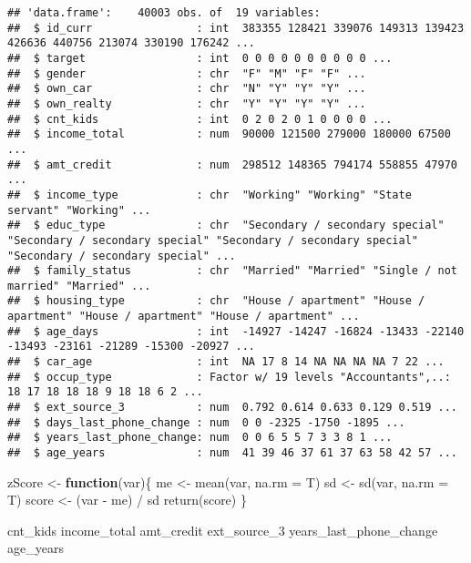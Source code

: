 \documentclass[
]{article}
\newenvironment{Shaded}{\begin{snugshade}}{\end{snugshade}}
\newcommand{\AttributeTok}[1]{\textcolor[rgb]{0.77,0.63,0.00}{#1}}
\newcommand{\ControlFlowTok}[1]{\textcolor[rgb]{0.13,0.29,0.53}{\textbf{#1}}}
\newcommand{\FunctionTok}[1]{\textcolor[rgb]{0.00,0.00,0.00}{#1}}
\newcommand{\NormalTok}[1]{#1}
\newcommand{\OtherTok}[1]{\textcolor[rgb]{0.56,0.35,0.01}{#1}}
\newcommand{\SpecialCharTok}[1]{\textcolor[rgb]{0.00,0.00,0.00}{#1}}
\begin{document}
\begin{verbatim}
## 'data.frame':    40003 obs. of  19 variables:
##  $ id_curr                : int  383355 128421 339076 149313 139423 426636 440756 213074 330190 176242 ...
##  $ target                 : int  0 0 0 0 0 0 0 0 0 0 ...
##  $ gender                 : chr  "F" "M" "F" "F" ...
##  $ own_car                : chr  "N" "Y" "Y" "Y" ...
##  $ own_realty             : chr  "Y" "Y" "Y" "Y" ...
##  $ cnt_kids               : int  0 2 0 2 0 1 0 0 0 0 ...
##  $ income_total           : num  90000 121500 279000 180000 67500 ...
##  $ amt_credit             : num  298512 148365 794174 558855 47970 ...
##  $ income_type            : chr  "Working" "Working" "State servant" "Working" ...
##  $ educ_type              : chr  "Secondary / secondary special" "Secondary / secondary special" "Secondary / secondary special" "Secondary / secondary special" ...
##  $ family_status          : chr  "Married" "Married" "Single / not married" "Married" ...
##  $ housing_type           : chr  "House / apartment" "House / apartment" "House / apartment" "House / apartment" ...
##  $ age_days               : int  -14927 -14247 -16824 -13433 -22140 -13493 -23161 -21289 -15300 -20927 ...
##  $ car_age                : int  NA 17 8 14 NA NA NA NA 7 22 ...
##  $ occup_type             : Factor w/ 19 levels "Accountants",..: 18 17 18 18 18 9 18 18 6 2 ...
##  $ ext_source_3           : num  0.792 0.614 0.633 0.129 0.519 ...
##  $ days_last_phone_change : num  0 0 -2325 -1750 -1895 ...
##  $ years_last_phone_change: num  0 0 6 5 5 7 3 3 8 1 ...
##  $ age_years              : num  41 39 46 37 61 37 63 58 42 57 ...
\end{verbatim}

\begin{Shaded}
\begin{Highlighting}[]
\NormalTok{zScore }\OtherTok{\textless{}{-}} \ControlFlowTok{function}\NormalTok{(var)\{}
\NormalTok{  me }\OtherTok{\textless{}{-}} \FunctionTok{mean}\NormalTok{(var, }\AttributeTok{na.rm =}\NormalTok{ T)}
\NormalTok{  sd }\OtherTok{\textless{}{-}} \FunctionTok{sd}\NormalTok{(var, }\AttributeTok{na.rm =}\NormalTok{ T)}
\NormalTok{  score }\OtherTok{\textless{}{-}}\NormalTok{ (var }\SpecialCharTok{{-}}\NormalTok{ me) }\SpecialCharTok{/}\NormalTok{ sd}
  \FunctionTok{return}\NormalTok{(score)}
\NormalTok{\}}
\end{Highlighting}
\end{Shaded}

cnt\_kids income\_total amt\_credit ext\_source\_3
years\_last\_phone\_change age\_years
\end{document}
